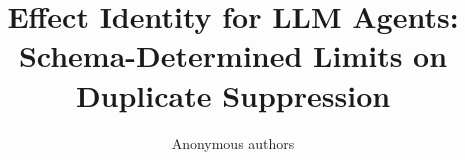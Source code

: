 \documentclass[10pt]{article}
\title{Effect Identity for LLM Agents:\\ Schema-Determined Limits on Duplicate Suppression}
\author{Anonymous authors}
\theoremstyle{definition}
\begin{document}
\maketitle

\begin{abstract}

\end{abstract}









\label{sec:refs-start}



\appendix


\end{document}
